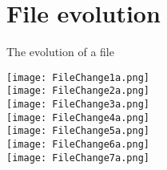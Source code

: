 \documentclass[xcolor=x11names,compress]{beamer}
\renewcommand{\(}{\begin{columns}}
\renewcommand{\)}{\end{columns}}
\newcommand{\<}[1]{\begin{column}{#1}}
\renewcommand{\>}{\end{column}}
\begin{document}
\section{File evolution}

\begin{frame}{The evolution of a file}
\begin{center}
\begin{itemize}
    {\texttt{[image: FileChange1a.png]} \\ }
    {\texttt{[image: FileChange2a.png]} \\ }
    {\texttt{[image: FileChange3a.png]} \\ }
    {\texttt{[image: FileChange4a.png]} \\ }
    {\texttt{[image: FileChange5a.png]} \\ }
    {\texttt{[image: FileChange6a.png]} \\ }
    {\texttt{[image: FileChange7a.png]} \\ }
\end{itemize}
\end{center}
\end{frame}
\end{document}
